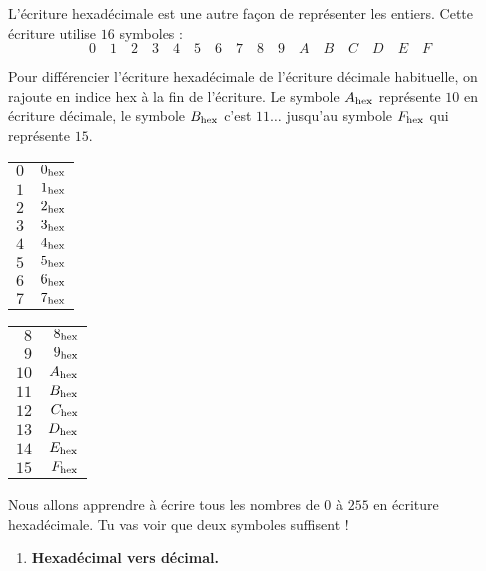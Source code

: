 \documentclass[class=report,crop=false, 12pt]{standalone}
\begin{document}
\begin{activite}[Hexadécimal]

L'écriture hexadécimale est une autre façon de représenter les entiers. Cette écriture utilise $16$ symboles :
$$0 \quad 1 \quad 2 \quad 3 \quad 4 \quad 5 \quad 6 \quad 7 \quad 8 \quad 9 \quad 
A \quad B \quad C \quad D \quad E \quad F$$

Pour différencier l'écriture hexadécimale de l'écriture décimale habituelle, on rajoute en indice \og hex \fg{} à la fin de l'écriture.
Le symbole $A_{\text{hex}}$ représente $10$ en écriture décimale, le symbole $B_{\text{hex}}$ c'est $11\ldots$ jusqu'au symbole $F_{\text{hex}}$ qui représente $15$.

  \begin{center}
    \begin{tabular}[ht]{r|r}
       
      $0$ & $0_{\text{hex}}$\\
      $1$ & $1_{\text{hex}}$\\
      $2$ & $2_{\text{hex}}$\\
      $3$ & $3_{\text{hex}}$\\
      $4$ & $4_{\text{hex}}$\\
      $5$ & $5_{\text{hex}}$\\
      $6$ & $6_{\text{hex}}$\\
      $7$ & $7_{\text{hex}}$\\

    \end{tabular}\qquad\qquad
    \begin{tabular}[ht]{r|r}
    
      $8$ & $8_{\text{hex}}$\\
      $9$  & $9_{\text{hex}}$\\
      $10$ & $A_{\text{hex}}$\\
      $11$ & $B_{\text{hex}}$\\
      $12$ & $C_{\text{hex}}$\\
      $13$ & $D_{\text{hex}}$\\
      $14$ & $E_{\text{hex}}$\\
      $15$ & $F_{\text{hex}}$\\    
    
    \end{tabular}
  \end{center}


Nous allons apprendre à écrire tous les nombres de $0$ à $255$ en écriture hexadécimale.
Tu vas voir que deux symboles suffisent !

\begin{enumerate}
  \item \textbf{Hexadécimal vers décimal.}
  

\end{enumerate}
\end{activite}
\end{document}
